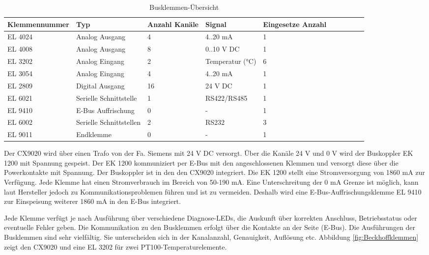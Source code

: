\begin{table}[htb]
\centering
\caption{Busklemmen-Übersicht}\vspace{6pt}
\begin{tabular}{p{2cm}p{3.6cm}p{1.4cm}p{2.8cm}p{3.2cm}ccccc}
\hline 
\rule[-1ex]{0pt}{2.5ex} \textbf{Klemmennummer} & \textbf{Typ} & \textbf{Anzahl Kanäle} & \textbf{Signal} & \textbf{Eingesetze Anzahl} \\ 
\hline 
\hline 
\rule[-1ex]{0pt}{2.5ex} EL 4024 & Analog Ausgang & 4 & 4..20 mA & 1 \\ 
\hline 
\rule[-1ex]{0pt}{2.5ex} EL 4008 & Analog Ausgang & 8 & 0..10 V DC & 1 \\ 
\hline 
\rule[-1ex]{0pt}{2.5ex} EL 3202 & Analog Eingang & 2 & Temperatur (°C) & 6 \\ 
\hline 
\rule[-1ex]{0pt}{2.5ex} EL 3054 & Analog Eingang & 4 & 4..20 mA & 1 \\ 
\hline 
\rule[-1ex]{0pt}{2.5ex} EL 2809 & Digital Ausgang & 16 & 24 V DC  & 1 \\ 
\hline 
\rule[-1ex]{0pt}{2.5ex} EL 6021 & Serielle Schnittstelle & 1 &  RS422/RS485 & 1 \\ 
\hline 
\rule[-1ex]{0pt}{2.5ex} EL 9410 & E-Bus Auffrischung & 0 & - & 1 \\ 
\hline 
\rule[-1ex]{0pt}{2.5ex} EL 6002 & Serielle Schnittstellen & 2 & RS232 & 3 \\ 
\hline 
\rule[-1ex]{0pt}{2.5ex} EL 9011 & Endklemme & 0 & - & 1 \\ 
\hline 
\hline 
\end{tabular} 
\label{tab:Klemmenübersicht}
\end{table}



Der CX9020 wird über einen Trafo von der Fa. Siemens mit 24 V DC versorgt. Über die Kanäle 24 V und 0 V wird der Buskoppler EK 1200 mit Spannung gespeist. Der EK 1200 kommuniziert per E-Bus mit den angeschlossenen Klemmen und versorgt diese über die Powerkontakte mit Spannung.  Der Buskoppler ist in den den CX9020 integriert. Die EK 1200 stellt eine Stromversorgung von 1860 mA zur Verfügung.  Jede Klemme hat einen Stromverbrauch im Bereich von 50-190 mA. Eine Unterschreitung der 0 mA Grenze ist möglich, kann laut Hersteller jedoch zu Kommunikationsproblemen führen und ist zu vermeiden. Deshalb wird eine E-Bus-Auffrischungsklemme EL 9410 zur Einspeisung weiterer 1860 mA in den E-Bus integriert. 

Jede Klemme verfügt je nach Ausführung über verschiedene Diagnose-LEDs, die Auskunft über korrekten Anschluss, Betriebsstatus oder eventuelle Fehler geben. Die Kommunikation zu den Busklemmen erfolgt über die Kontakte an der Seite (E-Bus). Die Ausführungen der Busklemmen sind sehr vielfältig. Sie unterscheiden sich in der Kanalanzahl, Genauigkeit, Auflösung etc. Abbildung \ref{fig:Beckhoffklemmen} zeigt den CX9020 und eine EL 3202 für zwei PT100-Temperaturelemente. 

